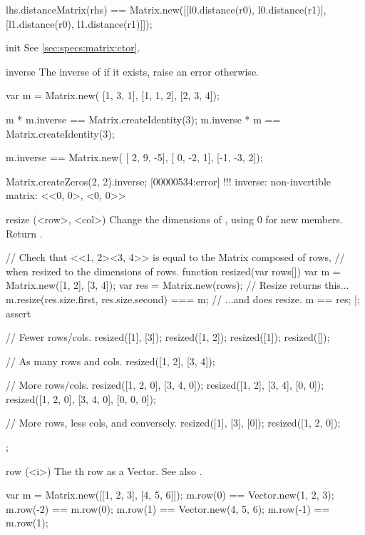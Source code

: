 \begin{urbiscriptapi}
\begin{urbiassert}
lhs.distanceMatrix(rhs)
  == Matrix.new([[l0.distance(r0), l0.distance(r1)],
                 [l1.distance(r0), l1.distance(r1)]]);
\end{urbiassert}


\item[init]%
  See \autoref{sec:specs:matrix:ctor}.


\item[inverse]%
  The inverse of \this if it exists, raise an error otherwise.
\begin{urbiassert}
var m = Matrix.new(
  [1, 3, 1],
  [1, 1, 2],
  [2, 3, 4]);

m * m.inverse == Matrix.createIdentity(3);
m.inverse * m == Matrix.createIdentity(3);

m.inverse == Matrix.new(
  [ 2,  9, -5],
  [ 0, -2,  1],
  [-1, -3,  2]);

Matrix.createZeros(2, 2).inverse;
[00000534:error] !!! inverse: non-invertible matrix: <<0, 0>, <0, 0>>
\end{urbiassert}


\item[resize](<row>, <col>)%
  Change the dimensions of \this, using 0 for new members.  Return \this.
\begin{urbiscript}
// Check that <<1, 2><3, 4>> is equal to the Matrix composed of rows,
// when resized to the dimensions of rows.
function resized(var rows[])
{
  var m = Matrix.new([1, 2], [3, 4]);
  var res = Matrix.new(rows);
  // Resize returns this...
  m.resize(res.size.first, res.size.second) === m;
  // ...and does resize.
  m == res;
}|;
assert
{
  // Fewer rows/cols.
  resized([1], [3]);
  resized([1, 2]);
  resized([1]);
  resized([]);

  // As many rows and cols.
  resized([1, 2], [3, 4]);

  // More rows/cols.
  resized([1, 2, 0], [3, 4, 0]);
  resized([1, 2], [3, 4], [0, 0]);
  resized([1, 2, 0], [3, 4, 0], [0, 0, 0]);

  // More rows, less cols, and conversely.
  resized([1], [3], [0]);
  resized([1, 2, 0]);
};
\end{urbiscript}


\item[row](<i>)%
  The th row as a Vector.  See also .
\begin{urbiassert}
var m = Matrix.new([[1, 2, 3], [4, 5, 6]]);
m.row(0) == Vector.new(1, 2, 3);  m.row(-2) == m.row(0);
m.row(1) == Vector.new(4, 5, 6);  m.row(-1) == m.row(1);


\end{urbiassert}
\end{urbiscriptapi}
